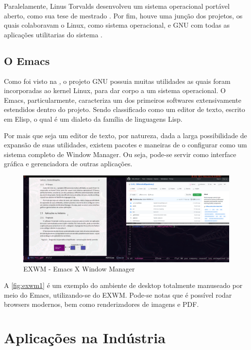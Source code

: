\documentclass[
12pt,				%
openright,			%
oneside,			%
a4paper,			%
english,			%
french,				%
spanish,			%
brazil,				%
]{abntex2}
\begin{document}
Paralelamente, Linus Torvalds desenvolveu um sistema operacional
portável aberto, como sua tese de mestrado
\cite{torvalds1997linux}. Por fim, houve uma junção dos projetos, os
quais colaboravam o Linux, como sistema operacional, e GNU com todas
as aplicações utilitarias do sistema \cite{stallman1997}.


\subsection{O Emacs}

Como foi visto na \href{sec:origem-linux}, o projeto GNU possuia muitas utilidades as quais foram incorporadas ao kernel Linux, para dar corpo a um sistema operacional. O Emacs, particularmente, caracteriza um dos primeiros softwares extensivamente estendidos dentro do projeto. Sendo classificado como um editor de texto, escrito em Elisp, o qual é um dialeto da família de linguagens Lisp.

Por mais que seja um editor de texto, por natureza, dada a larga possibilidade de expansão de suas utilidades, existem pacotes e maneiras de o configurar como um sistema completo de Window Manager. Ou seja, pode-se servir como interface gráfica e gerenciadora de outras aplicações.

\begin{figure}[ht]
  \centering
  \caption{\label{fig:exwm1} EXWM - Emacs X Window Manager}
  \includegraphics[width=\linewidth]{exwm2.png}
\end{figure}

A \autoref{fig:exwm1} é um exemplo do ambiente de desktop totalmente manuseado por meio do Emacs, utilizando-se do EXWM. Pode-se notas que é possível rodar browsers modernos, bem como renderizadores de imagens e PDF.

\section{Aplicações na Indústria}
\end{document}
